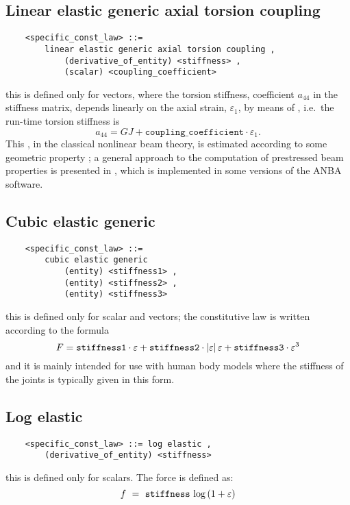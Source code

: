 \subsection{Linear elastic generic axial torsion coupling}
\label{sec:CONSTITUTIVE-LAWS:LINEAR-ELASTIC-GENERIC-AXIAL-TORSION-COUPLING}
\begin{verbatim}
    <specific_const_law> ::= 
        linear elastic generic axial torsion coupling ,  
            (derivative_of_entity) <stiffness> ,
            (scalar) <coupling_coefficient>
\end{verbatim}
this is defined only for  vectors, where the torsion stiffness,
coefficient $ a_{44} $ in the stiffness matrix, depends linearly on 
the axial strain, $ \varepsilon_1 $, by means of 
, i.e.\ the run-time torsion stiffness is 
\begin{displaymath}
	a_{44} = GJ + \mathtt{coupling\_coefficient} \cdot \varepsilon_1 .
\end{displaymath}
This , in the classical nonlinear beam theory,
is estimated according to some geometric property \cite{HOUBOLT-BROOKS-1957};
a general approach to the computation of prestressed beam properties
is presented in \cite{BORRI-MERLINI}, which is implemented in some versions
of the ANBA software.

\subsection{Cubic elastic generic}
\begin{verbatim}
    <specific_const_law> ::= 
        cubic elastic generic
            (entity) <stiffness1> ,
            (entity) <stiffness2> ,
            (entity) <stiffness3>
\end{verbatim}
this is defined only for scalar and  vectors; the constitutive
law is written according to the formula
\begin{displaymath}
	F = \mathtt{stiffness1} \cdot \varepsilon
	+ \mathtt{stiffness2} \cdot \left| \varepsilon \right|\varepsilon
	+ \mathtt{stiffness3} \cdot \varepsilon^3
\end{displaymath}
and it is mainly intended for use with human body models 
where the stiffness of the joints is typically given in this form.

\subsection{Log elastic}
\begin{verbatim}
    <specific_const_law> ::= log elastic ,
        (derivative_of_entity) <stiffness>      
\end{verbatim}
this is defined only for scalars. The force is defined as:
\begin{displaymath}
    f \ = \ \kw{stiffness} \ \llk{log}\plbr{1+\varepsilon}
\end{displaymath}
  
